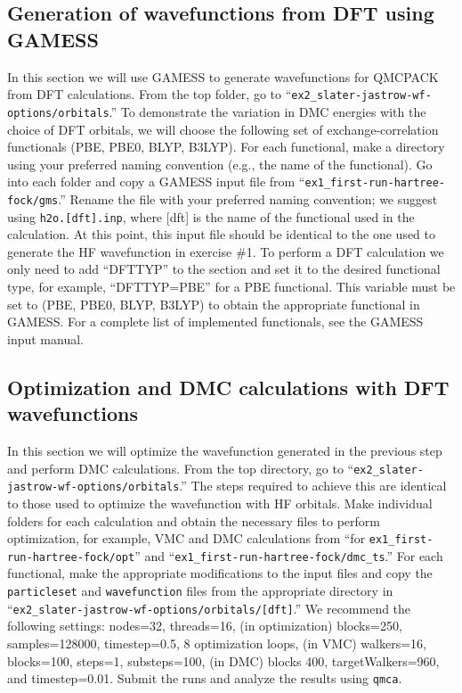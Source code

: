\subsection{Generation of wavefunctions from DFT using GAMESS}
In this section we will use GAMESS to generate wavefunctions for QMCPACK from
DFT calculations. From the top folder, go to ``\texttt{ex2\_slater-jastrow-wf-options/orbitals}.'' To demonstrate
the variation in DMC energies with the choice of DFT orbitals, we will choose the following
set of exchange-correlation functionals (PBE, PBE0, BLYP, B3LYP). For each functional,
make a directory using your preferred naming convention (e.g., the name of the functional).
Go into each folder and copy a GAMESS input file from %
``\texttt{ex1\_first-run-hartree-fock/gms}.'' %
 Rename the file with your preferred naming convention; we suggest using \texttt{h2o.[dft].inp}, where [dft] is the name of
the functional used in the calculation. At this point, this input file should be identical to the
one used to generate the HF wavefunction in exercise \#1. To perform a DFT
calculation we only need to add ``DFTTYP'' to the  section and set
it to the desired functional type, for example, ``DFTTYP=PBE'' for a PBE functional. This
variable must be set to (PBE, PBE0, BLYP, B3LYP) to obtain the appropriate functional in
GAMESS. For a complete list of implemented functionals, see the GAMESS input manual.


\subsection{Optimization and DMC calculations with DFT wavefunctions}
In this section we will optimize the wavefunction generated in the previous step and
perform DMC calculations. From the top directory, go to “\texttt{ex2\_slater-jastrow-wf-options/orbitals}.”
The steps required to achieve this are identical to those used to optimize the wavefunction
with HF orbitals. Make individual folders for each calculation and obtain the necessary files
to perform optimization, for example, VMC and DMC calculations from ``for \texttt{ex1\_first-run-hartree-fock/opt}'' and ``\texttt{ex1\_first-run-hartree-fock/dmc\_ts}.''
For each functional, make the appropriate modifications to the input files and copy the \texttt{particleset} and \texttt{wavefunction} files from the appropriate directory in “\texttt{ex2\_slater-jastrow-wf-options/orbitals/[dft]}.” We
recommend the following settings: nodes=32, threads=16, (in optimization) blocks=250,
samples=128000, timestep=0.5, 8 optimization loops, (in VMC) walkers=16, blocks=100,
steps=1, substeps=100, (in DMC) blocks 400, targetWalkers=960, and timestep=0.01. Submit
the runs and analyze the results using \texttt{qmca}.

